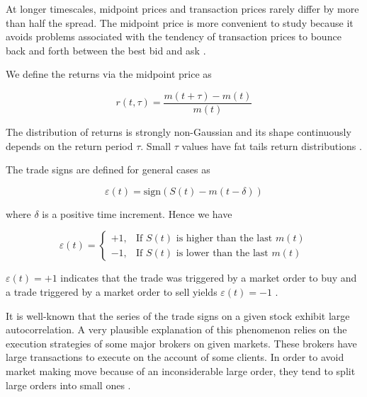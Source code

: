 At longer timescales, midpoint prices and transaction prices rarely differ by
more than half the spread. The midpoint price is more convenient to study
because it avoids problems associated with the tendency of transaction prices
to bounce back and forth between the best bid and ask
\cite{large_prices_changes}.

We define the returns via the midpoint price as

\begin{equation}\label{eq:midpoint_price_return}
    r\left(t,\tau\right) = \frac{m\left(t+\tau\right)-m\left(t\right)}
    {m\left(t\right)}
\end{equation}

The distribution of returns is strongly non-Gaussian and its shape continuously
depends on the return period $\tau$. Small $\tau$ values have fat tails return
distributions \cite{subtle_nature}.

The trade signs are defined for general cases as

\begin{equation}\label{eq:trade_sign_general}
    \varepsilon\left(t\right)=\text{sign}\left(S\left(t\right)
    -m\left(t-\delta\right)\right)
\end{equation}

where $\delta$ is a positive time increment. Hence we have

\begin{equation}\label{eq:trade_sign_results}
    \varepsilon\left(t\right)=\left\{
    \begin{array}{cc}
    +1, & \text{If } S\left(t\right)
    \text{ is higher than the last } m\left( t \right)\\
    -1, & \text{If } S\left(t\right)
    \text{ is lower than the last } m\left( t \right)
    \end{array}\right.
\end{equation}

$\varepsilon(t) = +1$ indicates that the trade was triggered by a market order
to buy and a trade triggered by a market order to sell yields
$\varepsilon(t) = -1$
\cite{subtle_nature,Bouchaud_2004,spread_changes_affect,quant_stock_price_response,order_flow_persistent}.

It is well-known that the series of the trade signs on a given stock exhibit
large autocorrelation. A very plausible explanation of this phenomenon relies
on the execution strategies of some major brokers on given markets. These
brokers have large transactions to execute on the account of some clients. In
order to avoid market making move because of an inconsiderable large order,
they tend to split large orders into small ones \cite{empirical_facts}.

